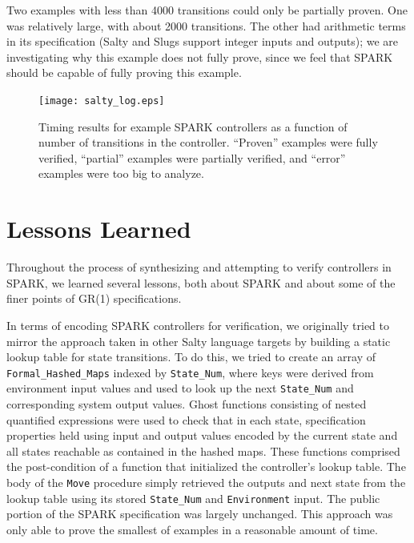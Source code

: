 \documentclass[runningheads]{llncs}
\begin{document}
Two examples with less than 4000 transitions could only be partially proven. 
One was relatively large, with about 2000 transitions. 
The other had arithmetic terms in its specification (Salty and Slugs support integer inputs and outputs); 
we are investigating why this example does not fully prove, 
since we feel that SPARK should be capable of fully proving this example.



\begin{figure}
\texttt{[image: salty\_log.eps]}
\caption{Timing results for example SPARK controllers as a function of number of transitions in the controller. ``Proven'' examples were fully verified, ``partial'' examples were partially verified, and ``error'' examples were too big to analyze.}
\label{fig:timingResults}
\end{figure}

\vspace{-1em}

\section{Lessons Learned}
\label{sec:lessonsLearned}

Throughout the process of synthesizing and attempting to verify controllers in SPARK, we learned several lessons, 
both about SPARK and about some of the finer points of GR(1) specifications.

In terms of encoding SPARK controllers for verification, we originally tried to 
mirror the approach taken in other Salty language targets by building a static lookup table for state transitions. 
To do this, we tried to create an array of \lstinline{Formal_Hashed_Maps} indexed by \lstinline{State_Num}, where keys 
were derived from environment input values and used to look up the next \lstinline{State_Num} and corresponding system output values. 
Ghost functions consisting of nested quantified expressions were used to check that in each state, specification properties held 
using input and output values encoded by the current state and all states reachable as contained in the hashed maps.
These functions comprised the post-condition of a function that initialized the controller's lookup table. 
The body of the \lstinline{Move} procedure simply retrieved the outputs and next state from the lookup table 
using its stored \lstinline{State_Num} and \lstinline{Environment} input.
The public portion of the SPARK specification was largely unchanged.
This approach was only able to prove the smallest of examples in a reasonable amount of time. 
\end{document}
